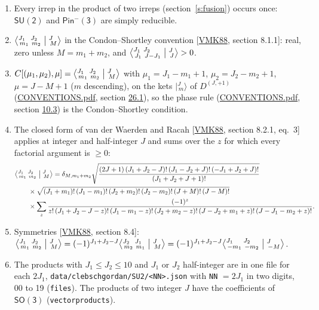 \documentclass[10pt,a4paper]{article}
\numberwithin{equation}{section}
\newcommand{\grp}[1]{\mathsf{#1}}
\newcommand{\irrJp}[2]{D^{(#1,#2)}}
\newcommand{\intx}{\mu}
\newcommand{\jm}[2]{\bigl\lvert{}^{#1}_{\,#2}\bigr\rangle}
\newcommand{\cgc}[6]{\bigl\langle{}^{#1}_{\,#2}\,{}^{#3}_{\,#4}\bigm\vert{}^{#5}_{\,#6}\bigr\rangle}
\newenvironment{romanlist}{\begin{enumerate}%
\renewcommand{\labelenumi}{(\roman{enumi})}}%
  {\end{enumerate}}
\begin{document}
\begin{romanlist}\raggedright
\item Every irrep in the product of two irreps (section~\ref{s:fusion}) occurs once: $\grp{SU(2)}$ and \href{Pinminus3.pdf}{$\grp{Pin^{-}(3)}$} are simply reducible.
\item $\cgc{J_1}{m_1}{J_2}{m_2}{J}{M}$ in the Condon--Shortley convention [\href{../../../REFERENCES.pdf\#ref.VMK88}{VMK88}, section 8.1.1]: real, zero unless $M = m_1 + m_2$, and $\cgc{J_1}{J_1}{J_2}{J-J_1}{J}{J} > 0$.
\item $C[(\intx_1,\intx_2),\intx] = \cgc{J_1}{m_1}{J_2}{m_2}{J}{M}$ with $\intx_1 = J_1 - m_1 + 1$, $\intx_2 = J_2 - m_2 + 1$, $\intx = J - M + 1$ ($m$ descending), on the kets $\jm{J}{m}$ of $\irrJp{J}{+1}$ (\href{../../CONVENTIONS.pdf}{CONVENTIONS.pdf}, section \href{../../CONVENTIONS.pdf\#conv.26.1}{26.1}), so the phase rule (\href{../../CONVENTIONS.pdf}{CONVENTIONS.pdf}, section \href{../../../rotation/CONVENTIONS.pdf\#conv.10.3}{10.3}) is the Condon--Shortley condition.
\item The closed form of van der Waerden and Racah [\href{../../../REFERENCES.pdf\#ref.VMK88}{VMK88}, section 8.2.1, eq.~3] applies at integer and half-integer $J$ and sums over the $z$ for which every factorial argument is $\ge 0$: \begin{equation}\begin{aligned}&\cgc{J_1}{m_1}{J_2}{m_2}{J}{M} = \delta_{M,m_1+m_2}\sqrt{\frac{(2J+1)\,(J_1+J_2-J)!\,(J_1-J_2+J)!\,(-J_1+J_2+J)!}{(J_1+J_2+J+1)!}}\\ &\qquad\times\sqrt{(J_1+m_1)!\,(J_1-m_1)!\,(J_2+m_2)!\,(J_2-m_2)!\,(J+M)!\,(J-M)!}\\ &\qquad\times\sum_z\frac{(-1)^z}{z!\,(J_1+J_2-J-z)!\,(J_1-m_1-z)!\,(J_2+m_2-z)!\,(J-J_2+m_1+z)!\,(J-J_1-m_2+z)!}.\end{aligned}\end{equation}
\item Symmetries [\href{../../../REFERENCES.pdf\#ref.VMK88}{VMK88}, section 8.4]: $\cgc{J_1}{m_1}{J_2}{m_2}{J}{M} = (-1)^{J_1+J_2-J}\cgc{J_2}{m_2}{J_1}{m_1}{J}{M} = (-1)^{J_1+J_2-J}\cgc{J_1}{{-m_1}}{J_2}{{-m_2}}{J}{{-M}}$.
\item The products with $J_1 \le J_2 \le 10$ and $J_1$ or $J_2$ half-integer are in one file for each $2J_1$, \texttt{data/clebschgordan/SU2/<NN>.json} with \texttt{NN} $= 2J_1$ in two digits, 00 to 19 (\texttt{files}). The products of two integer $J$ have the coefficients of \href{../../../rotation/data/pdf/SO3.pdf}{$\grp{SO(3)}$} (\texttt{vectorproducts}).
\end{romanlist}
\end{document}
